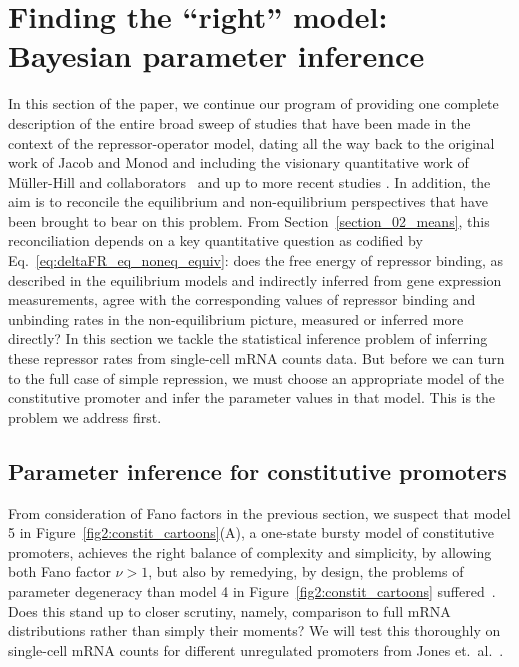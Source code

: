 \section{Finding the ``right'' model: Bayesian parameter inference}
\label{section_04_bayesian_inference}

In this section of the paper, we continue our program of providing one complete
description of the entire broad sweep of studies that have been made in the
context of the repressor-operator model, dating all the way back to the original
work of Jacob and Monod and including the visionary quantitative work of
M\"{u}ller-Hill and collaborators~\cite{Oehler1990} and up to more recent
studies \cite{Garcia2011a}. In addition, the aim is to reconcile the equilibrium
and non-equilibrium perspectives that have been brought to bear on this problem.
From Section~\ref{section_02_means}, this reconciliation depends on a key
quantitative question as codified by Eq.~\ref{eq:deltaFR_eq_noneq_equiv}: does
the free energy of repressor binding, as described in the equilibrium models and
indirectly inferred from gene expression measurements, agree with the
corresponding values of repressor binding and unbinding rates in the
non-equilibrium picture, measured or inferred more directly? In this section we
tackle the statistical inference problem of inferring these repressor rates from
single-cell mRNA counts data. But before we can turn to the full case of simple
repression, we must choose an appropriate model of the constitutive promoter and
infer the parameter values in that model. This is the problem we address first.


\subsection{Parameter inference for constitutive promoters}

From consideration of Fano factors in the previous section, we suspect that
model 5 in Figure~\ref{fig2:constit_cartoons}(A), a one-state bursty model of
constitutive promoters, achieves the right balance of complexity and simplicity,
by allowing both Fano factor $\nu>1$, but also by remedying, by design, the
problems of parameter degeneracy than model 4 in
Figure~\ref{fig2:constit_cartoons} suffered~\cite{Razo-Mejia2020}. Does this
stand up to closer scrutiny, namely, comparison to full mRNA distributions
rather than simply their moments? We will test this thoroughly on single-cell
mRNA counts for different unregulated promoters from Jones et.\
al.~\cite{Jones2014}.

